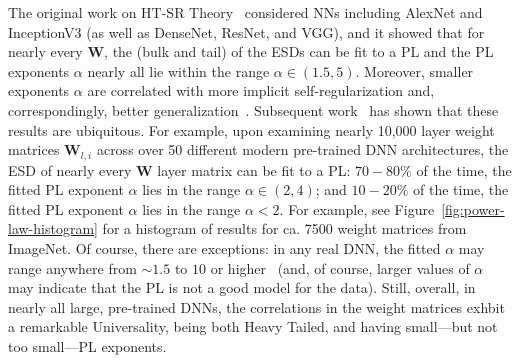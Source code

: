 The original work on HT-SR Theory~\cite{MM18_TR} considered NNs including AlexNet and InceptionV3 (as well as DenseNet, ResNet, and VGG), and it showed that for nearly every $\mathbf{W}$, the (bulk and tail) of the ESDs can be fit to a PL and the PL exponents $\alpha$ nearly all lie within the range $\alpha\in(1.5,5)$.
Moreover, smaller exponents $\alpha$ are correlated with more implicit self-regularization and, correspondingly, better generalization~\cite{MM18_TR}.
Subsequent work~\cite{MM18_unpub_work} has shown that these results are ubiquitous.
For example, 
upon examining nearly 10,000 layer weight matrices $\mathbf{W}_{l,i}$ across over 50 different modern pre-trained DNN architectures, the ESD of nearly every $\mathbf{W}$ layer matrix can be fit to a PL:
$70-80\%$ of the time, the fitted PL exponent $\alpha$ lies in the range $\alpha\in(2,4)$; and  %
$10-20\%$ of the time, the fitted PL exponent $\alpha$ lies in the range $\alpha< 2$.  %
For example, see Figure~\ref{fig:power-law-histogram} for a histogram of results for ca. 7500 weight matrices from ImageNet.
Of course, there are exceptions: in any real DNN, the fitted $\alpha$ may range anywhere from $\sim 1.5$ to $10$ or higher~\cite{MM18_unpub_work} (and, of course, larger values of $\alpha$ may indicate that the PL is not a good model for the data).  
Still, overall, in nearly all large, pre-trained DNNs, the correlations in the  weight matrices exhbit a remarkable Universality, being both Heavy Tailed, and having small---but not too small---PL exponents. 

